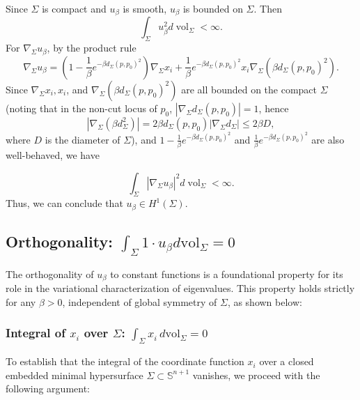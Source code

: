 \documentclass[a4, 12pt]{amsart}
\numberwithin{equation}{section} \numberwithin{equation}{section}
\begin{document}
Since $\Sigma$ is compact and $u_{\beta}$ is smooth, $u_{\beta}$ is bounded on $\Sigma$. Then
\begin{equation*}\int_{\Sigma} u_{\beta}^{2} d \operatorname{vol}_{\Sigma}<\infty.\end{equation*} For $\nabla_{\Sigma} u_{\beta}$, by the product rule
\begin{equation}\label{eq-nabla-u-b}\nabla_{\Sigma} u_{\beta}=\left(1-\frac{1}{\beta} e^{-\beta d_{\Sigma}\left(p, p_{0}\right)^{2}}\right) \nabla_{\Sigma} x_{i}+\frac{1}{\beta} e^{-\beta d_{\Sigma}\left(p, p_{0}\right)^{2}} x_{i} \nabla_{\Sigma}\left(\beta d_{\Sigma}\left(p, p_{0}\right)^{2}\right).\end{equation}
Since $\nabla_{\Sigma} x_{i}, x_{i}$, and $\nabla_{\Sigma}\left(\beta d_{\Sigma}\left(p, p_{0}\right)^{2}\right)$ are all bounded on the compact $\Sigma$ (noting that in the non-cut locus of $p_0$, $|\nabla_\Sigma d_{\Sigma}(p,p_0)| = 1$, hence $$|\nabla_\Sigma (\beta d_{\Sigma}^2)| = 2\beta d_{\Sigma}(p,p_0)|\nabla_\Sigma d_{\Sigma}| \leq 2\beta D,$$ where $D$ is the diameter of $\Sigma$), and $1-\frac{1}{\beta} e^{-\beta d_{\Sigma}\left(p, p_{0}\right)^{2}}$ and $\frac{1}{\beta} e^{-\beta d_{\Sigma}\left(p, p_{0}\right)^{2}}$ are also well-behaved, we have


\begin{equation*}\int_{\Sigma}\left|\nabla_{\Sigma} u_{\beta}\right|^{2} d \operatorname{vol}_{\Sigma}<\infty.\end{equation*} Thus, we can conclude that $u_{\beta} \in H^{1}(\Sigma)$.










\subsection{Orthogonality: $\int_{\Sigma}1\cdot u_{\beta} d \mathrm{vol}_{\Sigma}=0$}

The orthogonality of $u_{\beta}$ to constant functions is a foundational property for its role in the variational characterization of eigenvalues. This property holds strictly for any $\beta > 0$, independent of global symmetry of $\Sigma$, as shown below:

\subsubsection{Integral of $x_i$ over $\Sigma$: $\int_{\Sigma} x_i \, d\mathrm{vol}_{\Sigma} = 0$}
To establish that the integral of the coordinate function \( x_i \) over a closed embedded minimal hypersurface \( \Sigma \subset \mathbb{S}^{n+1} \) vanishes, we proceed with the following  argument:
\end{document}
